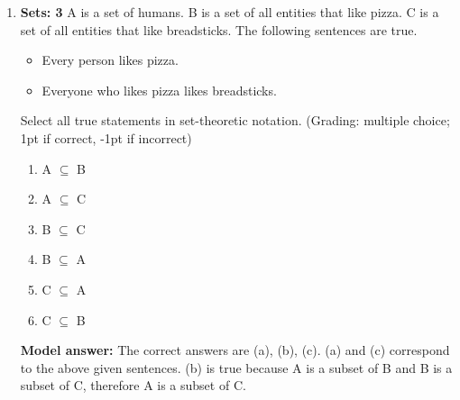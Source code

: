 \documentclass[a4,11pt]{article}
\begin{document}
\begin{enumerate}[leftmargin = 12pt]
\item {\bf Sets: 3}  A is a set of humans. B is a set of all entities that like pizza. C is a set of all entities that like breadsticks.  The following sentences are true. 

\begin{itemize}[noitemsep]
\item Every person likes pizza.
\item Everyone who likes pizza likes breadsticks.
\end{itemize}

Select all true statements in set-theoretic notation. (Grading: multiple choice; 1pt if correct, -1pt if incorrect)

\begin{enumerate}
\item A $\subseteq$ B
\item A $\subseteq$ C
\item B $\subseteq$ C
\item B $\subseteq$ A
\item C $\subseteq$ A
\item C $\subseteq$ B
\end{enumerate}

{\bf Model answer:} The correct answers are (a), (b), (c). (a) and (c) correspond to the above given sentences. (b) is true because A is a subset of B and B is a subset of C, therefore A is a subset of C.

\end{enumerate}
\end{document}
